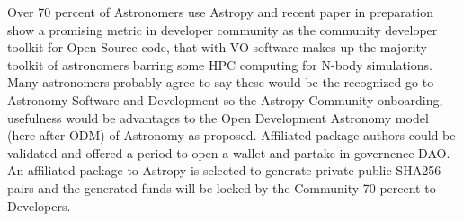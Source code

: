 \documentclass[final,5p,times,twocolumn,authoryear]{elsarticle}
\begin{document}

Over 70 percent of Astronomers use  Astropy and recent paper in preparation show a promising metric in developer community as the community developer toolkit for Open Source code, that with VO software makes up the majority toolkit of astronomers barring some HPC computing for N-body simulations. Many astronomers probably agree to say these would be the recognized go-to  Astronomy Software and Development so the Astropy Community onboarding, usefulness would be advantages to the Open Development Astronomy model (here-after ODM) of Astronomy as proposed. Affiliated package authors could be validated and offered a period to open a wallet and partake in governence DAO. An affiliated package to Astropy is selected to generate private public SHA256 pairs and the generated funds will be locked by the Community 70 percent to Developers. 
\end{document}
